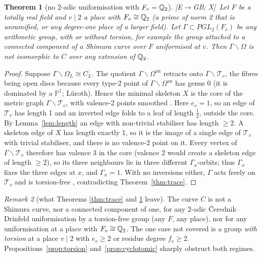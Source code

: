\documentclass[11pt]{amsart}
\numberwithin{equation}{section}
\theoremstyle{plain}
\newtheorem{theorem}{Theorem}[section]
\theoremstyle{definition}\newtheorem{definition}[theorem]{Definition}
\theoremstyle{remark}\newtheorem{remark}[theorem]{Remark}
\newcommand{\ctag}[1]{\textup{\textsf{\scriptsize[#1]}}}
\begin{document}
\begin{theorem}[no 2-adic uniformisation with $F_v=\mathbb{Q}_2$]\label{thm:q2}
\ctag{E$\to$GB; X}\ Let $F$ be a totally real field and $v\mid2$ a place with $F_v\cong\mathbb{Q}_2$ (a prime of norm 2 that is unramified, or any degree-one place of a larger field). Let $\Gamma\subset PGL_2(F_v)$ be any arithmetic group, with or without torsion, for example the group attached to a connected component of a Shimura curve over $F$ uniformised at $v$. Then $\Gamma\backslash\Omega$ is not isomorphic to $C$ over any extension of $\mathbb{Q}_2$.
\end{theorem}
\begin{proof}
Suppose $\Gamma\backslash\Omega_L\cong C_L$. The quotient $\Gamma\backslash\Omega^{\mathrm{an}}$ retracts onto $\Gamma\backslash\mathcal T_v$, the fibres being open discs because every type-2 point of $\Gamma\backslash\Omega^{\mathrm{an}}$ has genus 0 (it is dominated by a $\mathbb P^1$; L\"uroth). Hence the minimal skeleton $X$ is the core of the metric graph $\Gamma\backslash\mathcal T_v$, with valence-2 points smoothed \cite{berkovich90,bpr13}. Here $e_v=1$, so an edge of $\mathcal T_v$ has length 1 and an inverted edge folds to a leaf of length $\tfrac12$, outside the core. By Lemma~\ref{lem:length} an edge with non-trivial stabiliser has length $\ge2$. A skeleton edge of $X$ has length exactly 1, so it is the image of a single edge of $\mathcal T_v$ with trivial stabiliser, and there is no valence-2 point on it. Every vertex of $\Gamma\backslash\mathcal T_v$ therefore has valence 3 in the core (valence 2 would create a skeleton edge of length $\ge2$), so its three neighbours lie in three different $\Gamma_x$-orbits; thus $\Gamma_x$ fixes the three edges at $x$, and $\Gamma_x=1$. With no inversions either, $\Gamma$ acts freely on $\mathcal T_v$ and is torsion-free \cite{serre80}, contradicting Theorem~\ref{thm:trace}.
\end{proof}

\begin{remark}[what Theorems \ref{thm:trace} and \ref{thm:q2} leave]\label{rem:left}
The curve $C$ is not a Shimura curve, nor a connected component of one, for any 2-adic \v{C}erednik--Drinfeld uniformisation by a torsion-free group (any $F$, any place), nor for any uniformisation at a place with $F_v\cong\mathbb{Q}_2$. The one case not covered is a group \emph{with torsion} at a place $v\mid2$ with $e_v\ge2$ or residue degree $f_v\ge2$. Propositions~\ref{prop:torsion} and~\ref{prop:cyclotomic} sharply obstruct both regimes.
\end{remark}
\end{document}
